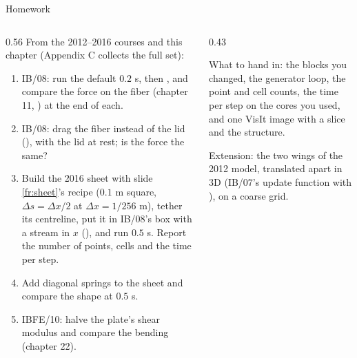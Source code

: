 \documentclass[aspectratio=169,11pt]{beamer}
\begin{document}
\begin{frame}{Homework}
\label{fr:hw}
\begin{columns}[T,onlytextwidth]
\begin{column}{0.56\textwidth}
\footnotesize From the 2012--2016 courses and this chapter (Appendix C collects the full set):
\begin{enumerate}
  \item IB/08: run the default $0.2$ s, then , and compare the force on the fiber (chapter 11, ) at the end of each.
  \item IB/08: drag the fiber instead of the lid (), with the lid at rest; is the force the same?
  \item Build the 2016 sheet with slide \ref{fr:sheet}'s recipe ($0.1$ m square, $\Delta s = \Delta x/2$ at $\Delta x = 1/256$ m), tether its centreline, put it in IB/08's box with a stream in $x$ (), and run $0.5$ s. Report the number of points, cells and the time per step.
  \item Add diagonal springs to the sheet and compare the shape at $0.5$ s.
  \item IBFE/10: halve the plate's shear modulus and compare the bending (chapter 22).
\end{enumerate}
\end{column}
\begin{column}{0.43\textwidth}
\begin{punchbox}
\scriptsize What to hand in: the  blocks you changed, the generator loop, the point and cell counts, the time per step on the cores you used, and one VisIt image with a slice and the structure.
\end{punchbox}
\scriptsize Extension: the two wings of the 2012 model, translated apart in 3D (IB/07's update function with ), on a coarse grid.
\end{column}
\end{columns}
\end{frame}
\end{document}
